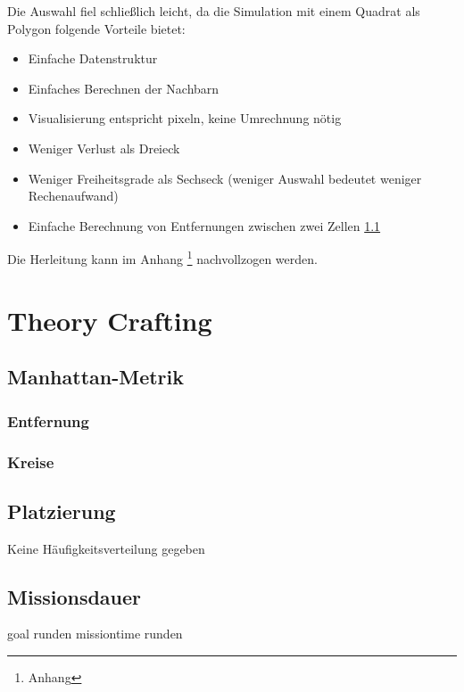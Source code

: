 \documentclass{article}
\begin{document}
Die Auswahl fiel schließlich leicht, da die Simulation mit einem Quadrat als Polygon
folgende Vorteile bietet:

\begin{itemize}
\item Einfache Datenstruktur
\item Einfaches Berechnen der Nachbarn
\item Visualisierung entspricht pixeln, keine Umrechnung nötig
\item Weniger Verlust als Dreieck
\item Weniger Freiheitsgrade als Sechseck (weniger Auswahl bedeutet weniger Rechenaufwand)
\item Einfache Berechnung von Entfernungen zwischen zwei Zellen \ref{sec:manhattan}
\end{itemize}

Die Herleitung kann im Anhang \footnote{Anhang} nachvollzogen werden.

\clearpage
\section{Theory Crafting}

\subsection{Manhattan-Metrik}
\label{sec:manhattan}

\subsubsection{Entfernung}


\subsubsection{Kreise}


\subsection{Platzierung}

Keine Häufigkeitsverteilung gegeben

\subsection{Missionsdauer}

goal runden
missiontime runden

\end{document}
